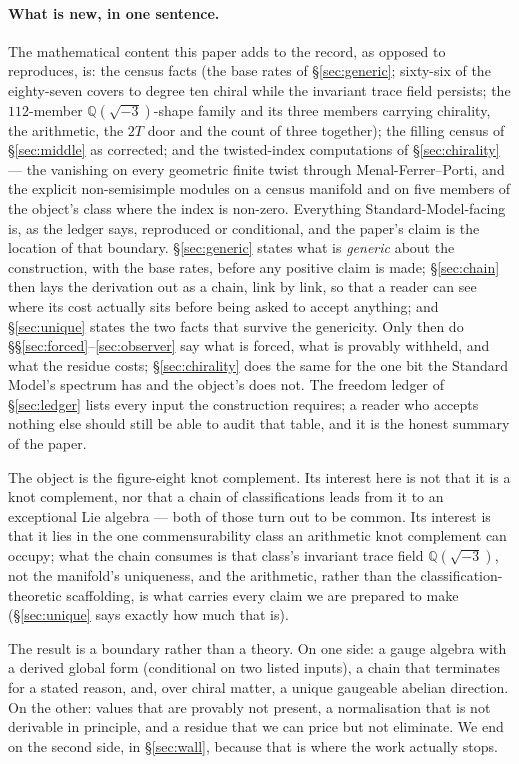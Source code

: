 \documentclass[11pt,a4paper]{article}
\theoremstyle{definition}
\theoremstyle{remark}
\newcommand{\Q}{\mathbb{Q}}
\begin{document}
\paragraph{What is new, in one sentence.} The mathematical content this paper adds to the record, as opposed to reproduces,
is: the census facts (the base rates of \S\ref{sec:generic}; sixty-six of the eighty-seven covers to degree ten chiral while
the invariant trace field persists; the $112$-member $\Q(\sqrt{-3})$-shape family and its three members carrying chirality,
the arithmetic, the $2T$ door and the count of three together); the filling census of \S\ref{sec:middle} as corrected; and the
twisted-index computations of \S\ref{sec:chirality} --- the vanishing on every geometric finite twist through
Menal-Ferrer--Porti, and the explicit non-semisimple modules on a census manifold and on five members of the object's class
where the index is non-zero. Everything Standard-Model-facing is, as the ledger says, reproduced or conditional, and the
paper's claim is the location of that boundary. \S\ref{sec:generic} states what is \emph{generic} about the
construction, with the base rates, before any positive claim is made; \S\ref{sec:chain} then lays the derivation out as a chain, link by link, so that a reader can see where its cost actually sits before being asked to accept anything; and \S\ref{sec:unique} states the two facts that survive the genericity. Only then do \S\S\ref{sec:forced}--\ref{sec:observer} say what is forced,
what is provably withheld, and what the residue costs; \S\ref{sec:chirality} does the same for the one bit the Standard Model's spectrum has
and the object's does not. The freedom ledger of
\S\ref{sec:ledger} lists every input the construction requires; a reader who accepts nothing else
should still be able to audit that table, and it is the honest summary of the paper.

The object is the figure-eight knot complement. Its interest here is not that it is a knot
complement, nor that a chain of classifications leads from it to an exceptional Lie algebra --- both
of those turn out to be common. Its interest is that it lies in the one commensurability class an arithmetic knot complement can
occupy; what the chain consumes is that class's invariant trace field $\Q(\sqrt{-3})$, not the manifold's uniqueness, and
the arithmetic, rather than the classification-theoretic scaffolding, is what carries every claim we are prepared to make
(\S\ref{sec:unique} says exactly how much that is).

The result is a boundary rather than a theory. On one side: a gauge algebra with a derived global
form (conditional on two listed inputs), a chain that terminates for a stated reason, and, over chiral matter, a unique
gaugeable abelian direction. On the
other: values that are provably not present, a normalisation that is not derivable in principle, and
a residue that we can price but not eliminate. We end on the second side, in
\S\ref{sec:wall}, because that is where the work actually stops.
\end{document}
